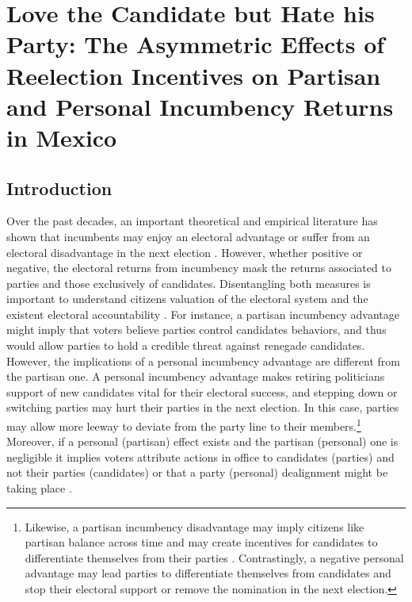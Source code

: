 \chapter{Love the Candidate but Hate his Party: The Asymmetric Effects of Reelection Incentives on Partisan and Personal Incumbency Returns in Mexico}
\section{Introduction}

Over the past decades, an important theoretical and empirical literature has shown that incumbents may enjoy an electoral advantage \citep{ashworth_2012, cox_morgensten_1993, cox_katz_1996, ansolabehere_snyder_2000, ashworth_bdm_2008, ashworth_etal_2019} or suffer from an electoral disadvantage in the next election \citep{klasnja_2015, klasnja_titiunik_2017}. However, whether positive or negative, the electoral returns from incumbency mask the returns associated to parties and those exclusively of candidates. Disentangling both measures is important to understand citizens valuation of the electoral system and the existent electoral accountability \citep{mayhew_1974, fowler_hall_2014}. For instance, a partisan incumbency advantage might imply that voters believe parties control candidates behaviors, and thus would allow parties to hold a credible threat against renegade candidates. %
However, the implications of a personal incumbency advantage are different from the partisan one. A personal incumbency advantage makes retiring politicians support of new candidates vital for their electoral success, and stepping down or switching parties may hurt their parties in the next election. In this case, parties may allow more leeway to deviate from the party line to their members.\footnote{Likewise, a partisan incumbency disadvantage may imply citizens like partisan balance across time and may create incentives for candidates to differentiate themselves from their parties \citep{klasnja_titiunik_2017}. Contrastingly, a negative personal advantage may lead parties to differentiate themselves from candidates and stop their electoral support or remove the nomination in the next election.} Moreover, if a personal (partisan) effect exists and the partisan (personal) one is negligible it implies voters attribute actions in office to candidates (parties) and not their parties (candidates) or that a party (personal) dealignment might be taking place \citep{cox_katz_1996}.   
   
